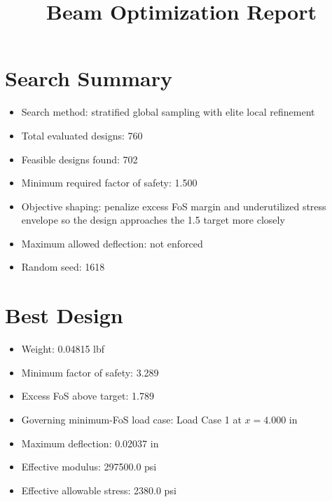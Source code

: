 \documentclass[11pt]{article}
\title{Beam Optimization Report}
\date{}
\begin{document}
\maketitle

\section*{Search Summary}
\begin{itemize}
\item Search method: stratified global sampling with elite local refinement
\item Total evaluated designs: 760
\item Feasible designs found: 702
\item Minimum required factor of safety: 1.500
\item Objective shaping: penalize excess FoS margin and underutilized stress envelope so the design approaches the 1.5 target more closely
\item Maximum allowed deflection: not enforced
\item Random seed: 1618
\end{itemize}

\section*{Best Design}
\begin{itemize}
\item Weight: 0.04815 lbf
\item Minimum factor of safety: 3.289
\item Excess FoS above target: 1.789
\item Governing minimum-FoS load case: Load Case 1 at $x=4.000$ in
\item Maximum deflection: 0.02037 in
\item Effective modulus: 297500.0 psi
\item Effective allowable stress: 2380.0 psi
\end{itemize}
\end{document}
